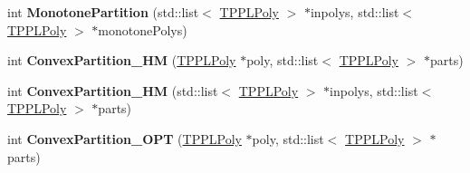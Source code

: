 \begin{DoxyCompactItemize}
\item 
\mbox{\label{class_t_p_p_l_partition_a74f677640bb97f71992c53d257b7c023}} 
int {\bfseries Monotone\+Partition} (std\+::list$<$ \mbox{\hyperlink{class_t_p_p_l_poly}{T\+P\+P\+L\+Poly}} $>$ $\ast$inpolys, std\+::list$<$ \mbox{\hyperlink{class_t_p_p_l_poly}{T\+P\+P\+L\+Poly}} $>$ $\ast$monotone\+Polys)
\item 
\mbox{\label{class_t_p_p_l_partition_a5bb5bc6f7bc6747925b4d10b134d83b9}} 
int {\bfseries Convex\+Partition\+\_\+\+HM} (\mbox{\hyperlink{class_t_p_p_l_poly}{T\+P\+P\+L\+Poly}} $\ast$poly, std\+::list$<$ \mbox{\hyperlink{class_t_p_p_l_poly}{T\+P\+P\+L\+Poly}} $>$ $\ast$parts)
\item 
\mbox{\label{class_t_p_p_l_partition_a7729311c791148efc210fba84b908c53}} 
int {\bfseries Convex\+Partition\+\_\+\+HM} (std\+::list$<$ \mbox{\hyperlink{class_t_p_p_l_poly}{T\+P\+P\+L\+Poly}} $>$ $\ast$inpolys, std\+::list$<$ \mbox{\hyperlink{class_t_p_p_l_poly}{T\+P\+P\+L\+Poly}} $>$ $\ast$parts)
\item 
\mbox{\label{class_t_p_p_l_partition_a5e172d8491d92d105b71e5e09ab83a1c}} 
int {\bfseries Convex\+Partition\+\_\+\+O\+PT} (\mbox{\hyperlink{class_t_p_p_l_poly}{T\+P\+P\+L\+Poly}} $\ast$poly, std\+::list$<$ \mbox{\hyperlink{class_t_p_p_l_poly}{T\+P\+P\+L\+Poly}} $>$ $\ast$parts)
\end{DoxyCompactItemize}
